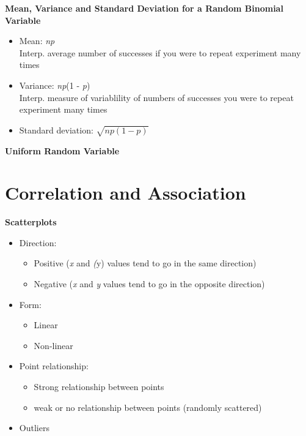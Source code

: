 \documentclass{article}
\begin{document}
\noindent
\textbf{Mean, Variance and Standard Deviation for a Random Binomial Variable}
\begin{itemize}
    \item Mean: \emph{np} \\
    Interp. average number of successes if you were to repeat experiment many times
    \item Variance: \emph{np}(1 - \emph{p}) \\
    Interp. measure of variablility of numbers of successes you were to repeat experiment many times
    \item Standard deviation: \begin{math}
        \sqrt{np(1-p)}
    \end{math}
    
\end{itemize}

\textbf{Uniform Random Variable}

\section{Correlation and Association}

\textbf{Scatterplots}
\begin{itemize}
    \item Direction:
    \begin{itemize}
        \item Positive (\emph{x} and \emph(y) values tend to go in the same direction)
        \item Negative (\emph{x} and \emph{y} values tend to go in the opposite direction)
    \end{itemize}
    \item Form:
    \begin{itemize}
        \item Linear
        \item Non-linear
    \end{itemize}
    \item Point relationship:
    \begin{itemize}
        \item Strong relationship between points
        \item weak or no relationship between points (randomly scattered)
    \end{itemize}
    \item Outliers
\end{itemize}
\end{document}
